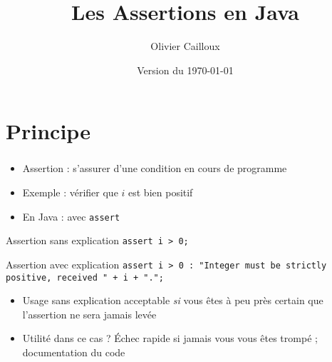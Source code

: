 \documentclass[english, french]{beamer}
\title{Les Assertions en Java}
\author{Olivier Cailloux}
\institute[LAMSADE]{LAMSADE, Université Paris-Dauphine}
\date{Version du \today}
\begin{document}


\begin{frame}[plain]
   \titlepage
\end{frame}
\addtocounter{framenumber}{-1}

\section{Principe}
\begin{frame}
	\frametitle{\secname}
	\begin{itemize}
		\item Assertion : s’assurer d’une condition en cours de programme
		\item Exemple : vérifier que $i$ est bien positif
		\item En Java : avec \texttt{assert}
	\end{itemize}
	\begin{block}{Assertion sans explication}
		\texttt{assert i > 0;}
	\end{block}
	\begin{block}{Assertion avec explication}
		\texttt{assert i > 0 : "Integer must be strictly positive, received " + i + ".";}
	\end{block}
	\begin{itemize}
		\item Usage sans explication acceptable \emph{si} vous êtes à peu près certain que l’assertion ne sera jamais levée
		\item Utilité dans ce cas ? \pause Échec rapide si jamais vous vous êtes trompé ; documentation du code
	\end{itemize}
\end{frame}
\end{document}
